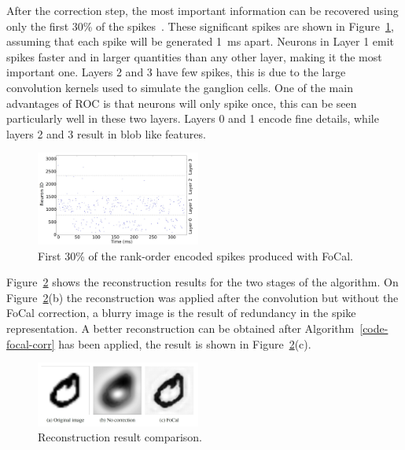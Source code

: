 \documentclass{frontiersENG} %
\begin{document}
After the correction step, the most important information can be recovered using only the first 30\% of the spikes~\citep{sen2009evaluating}. These significant spikes are shown in Figure~\ref{fig-raster-plot-30pc}, assuming that each spike will be generated 1~ms apart. Neurons in Layer 1 emit spikes faster and in larger quantities than any other layer, making it the most important one. Layers 2 and 3 have few spikes, this is due to the large convolution kernels used to simulate the ganglion cells. One of the main advantages of ROC is that neurons will only spike once, this can be seen particularly well in these two layers. Layers 0 and 1 encode fine details, while layers 2 and 3 result in blob like features.
\begin{figure}[hbt]
	\centering
	\includegraphics[width=0.48\textwidth]{fig3}
	\caption{First 30\% of the rank-order encoded spikes produced with FoCal.}
	\label{fig-raster-plot-30pc}
\end{figure}

Figure~\ref{fig-reconstruction-results} shows the reconstruction results for the two stages of the algorithm. On Figure~\ref{fig-reconstruction-results}(b) the reconstruction was applied after the convolution but without the FoCal correction, a blurry image is the result of redundancy in the spike representation. A better reconstruction can be obtained after Algorithm~\ref{code-focal-corr} has been applied, the result is shown in Figure~\ref{fig-reconstruction-results}(c).


\begin{figure}[hbt]
	\centering
	\includegraphics[width=0.48\textwidth]{fig4}
	\caption{Reconstruction result comparison.}
	\label{fig-reconstruction-results}
\end{figure}
\end{document}
